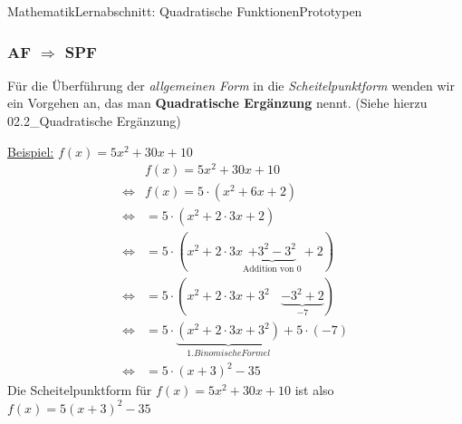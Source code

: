\documentclass[11pt,twocolumn,oneside,openany,headings=optiontotoc,11pt,numbers=noenddot]{article}
\begin{document}
\begin{worksheet}{Mathematik}{Lernabschnitt: Quadratische Funktionen}{Prototypen}
		\subsubsection*{AF \(\Rightarrow\) SPF}
		Für die Überführung der \textit{allgemeinen Form} in die \textit{Scheitelpunktform} wenden wir ein Vorgehen an, das man \textbf{Quadratische Ergänzung} nennt. \tiny{(Siehe hierzu 02.2\_Quadratische Ergänzung)}\normalsize\\
		\par\noindent
		\underline{Beispiel:} \(f(x) = 5x^2+30x +10\)
		\begin{align*}
			& f(x) = 5x^2+30x+10\\
			\Leftrightarrow & f(x) = 5\cdot(x^2+6x+2)\\
			\Leftrightarrow & = 5\cdot(x^2+2\cdot{}3x+2)\\
			\Leftrightarrow & = 5\cdot(x^2+2\cdot{}3x \underbrace{+ 3^2 - 3^2}_{\text{Addition von }0} +2)\\
			\Leftrightarrow & = 5\cdot(x^2 +2\cdot{}3x + 3^2\ \ \ \ \underbrace{- 3^2 +2}_{-7})\\
			\Leftrightarrow & = 5\cdot\underbrace{(x^2 + 2\cdot{}3x + 3^2)}_{1. Binomische Formel} +5\cdot(-7)\\
			\Leftrightarrow & = 5\cdot(x+3)^2 -35
		\end{align*}
		Die Scheitelpunktform für \(f(x) = 5x^2+30x+10\) ist also \colorbox{green!10}{\(f(x) = 5(x+3)^2 - 35\)}
	\end{worksheet}
\end{document}
